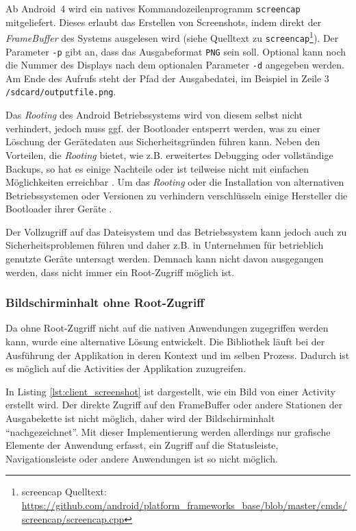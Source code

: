Ab Android~4 wird ein natives Kommandozeilenprogramm \texttt{screencap} mitgeliefert.
Dieses erlaubt das Erstellen von Screenshots, indem direkt der \emph{FrameBuffer} des Systems ausgelesen wird (siehe Quelltext zu \texttt{screencap}\footnote{screencap Quelltext: \url{https://github.com/android/platform_frameworks_base/blob/master/cmds/screencap/screencap.cpp}}).
Der Parameter \texttt{-p} gibt an, dass das Ausgabeformat \texttt{PNG} sein soll. 
Optional kann noch die Nummer des Displays nach dem optionalen Parameter \texttt{-d} angegeben werden.
Am Ende des Aufrufs steht der Pfad der Ausgabedatei, im Beispiel in Zeile 3 \texttt{/sdcard/outputfile.png}. 

Das \emph{Rooting} des Android Betriebssystems wird von diesem selbst nicht verhindert, jedoch muss ggf. der Bootloader entsperrt werden, was zu einer Löschung der Gerätedaten aus Sicherheitsgründen führen kann. 
Neben den Vorteilen, die \emph{Rooting} bietet, wie z.B. erweitertes Debugging oder vollständige Backups, so hat es einige Nachteile oder ist teilweise nicht mit einfachen Möglichkeiten erreichbar \cite[vgl.][]{androidsecurity}.
Um das \emph{Rooting} oder die Installation von alternativen Betriebssystemen oder Versionen zu verhindern verschlüsseln einige Hersteller die Bootloader ihrer Geräte \cite[vgl.][6\psq]{androiddataintegrity}.

Der Vollzugriff auf das Dateisystem und das Betriebssystem kann jedoch auch zu Sicherheitsproblemen führen und daher z.B. in Unternehmen für betrieblich genutzte Geräte untersagt werden.
Demnach kann nicht davon ausgegangen werden, dass nicht immer ein Root-Zugriff möglich ist.

\pagebreak

\subsubsection{Bildschirminhalt ohne Root-Zugriff}
Da ohne Root-Zugriff nicht auf die nativen Anwendungen zugegriffen werden kann, wurde eine alternative Lösung entwickelt.
Die Bibliothek läuft bei der Ausführung der Applikation in deren Kontext und im selben Prozess.
Dadurch ist es möglich auf die Activities der Applikation zuzugreifen.

In Listing \ref{lst:client_screenshot} ist dargestellt, wie ein Bild von einer Activity erstellt wird.
Der direkte Zugriff auf den FrameBuffer oder andere Stationen der Ausgabekette ist nicht möglich, daher wird der Bildschirminhalt \enquote{nachgezeichnet}.
Mit dieser Implementierung werden allerdings nur grafische Elemente der Anwendung erfasst, ein Zugriff auf die Statusleiste, Navigationsleiste oder andere Anwendungen ist so nicht möglich.

